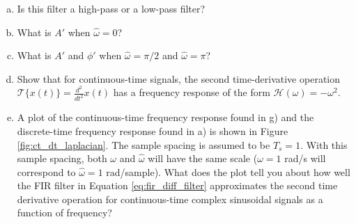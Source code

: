 \begin{enumerate}
\begin{enumerate}[a)]
          \item Is this filter a high-pass or a low-pass filter?

          \item What is $A'$ when $\hat{\omega}=0$?
          \item What is $A'$ and $\phi'$ when $\hat{\omega}=\pi/2$ and $\hat{\omega}=\pi$?
          \item Show that for continuous-time signals, the second
                time-derivative operation $\mathcal{T}\{x(t)\} =
                  \frac{d^2}{dt^2}x(t)$ has a frequency response of the form
                $\mathcal{H}(\omega)=-\omega^2$.

          \item A plot of the continuous-time frequency response found in g) and 
                the discrete-time frequency response found in a) is shown 
                in Figure \ref{fig:ct_dt_laplacian}. The sample spacing is 
                assumed to be $T_s=1$. With this sample spacing, both $\omega$ 
                and $\hat{\omega}$ will have the same scale 
                ($\omega = 1$ rad/s will correspond to $\hat{\omega}=1$ rad/sample). 
                What does the plot tell you about how well the FIR filter in 
                Equation \ref{eq:fir_diff_filter} approximates the second time derivative 
                operation for continuous-time complex sinusoidal signals as a function of frequency?
        \end{enumerate}



\end{enumerate}
